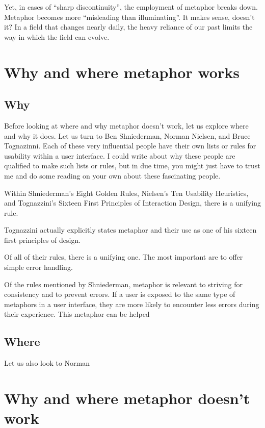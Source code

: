 \documentclass[11pt, oneside]{article}   	%
\begin{document}
Yet, in cases of ``sharp discontinuity'', the employment of metaphor breaks down. Metaphor becomes more ``misleading than illuminating''. It makes sense, doesn't it? In a field that changes nearly daily, the heavy reliance of our past limits the way in which the field can evolve.
\cite{ewd1036}

\section{Why and where metaphor works}
\subsection{Why}
Before looking at where and why metaphor doesn't work, let us explore where and why it does. Let us turn to Ben Shniederman, Norman Nielsen, and Bruce Tognazinni. Each of these very influential people have their own lists or rules for usability within a user interface. I could write about why these people are qualified to make such lists or rules, but in due time, you might just have to trust me and do some reading on your own about these fascinating people. 

Within Shniederman's Eight Golden Rules, Nielsen's Ten Usability Heuristics, and Tognazzini's Sixteen First Principles of Interaction Design, there is a unifying rule.

\cite{shniederman-golden-rules} \cite{tognazzini-first-principles} \cite{nielsen-usability-heuristics}

Tognazzini actually explicitly states metaphor and their use as one of his sixteen first principles of design.

Of all of their rules, there is a unifying one. The most important are to offer simple error handling. 

Of the rules mentioned by Shniederman, metaphor is relevant to striving for consistency and to prevent errors. If a user is exposed to the same type of metaphors in a user interface, they are more likely to encounter less errors during their experience. This metaphor can be helped 


\subsection{Where}
Let us also look to Norman

\section{Why and where metaphor doesn't work}
\end{document}
